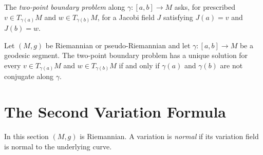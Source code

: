 The \emph{two-point boundary problem} along
$\gamma:[a,b]\to M$ asks, for prescribed
$v\in T_{\gamma(a)}M$ and $w\in T_{\gamma(b)}M$, for a Jacobi field $J$
satisfying $J(a)=v$ and $J(b)=w$.

\begin{proposition}
\label{prop:two-point-boundary-problem}


Let $(M,g)$ be Riemannian or pseudo-Riemannian and let
$\gamma:[a,b]\to M$ be a geodesic segment. The two-point boundary problem
has a unique solution for every
$v\in T_{\gamma(a)}M$ and $w\in T_{\gamma(b)}M$ if and only if
$\gamma(a)$ and $\gamma(b)$ are not conjugate along $\gamma$.
\end{proposition}

\section{The Second Variation Formula}

In this section $(M,g)$ is Riemannian. A variation is \emph{normal} if its
variation field is normal to the underlying curve.

